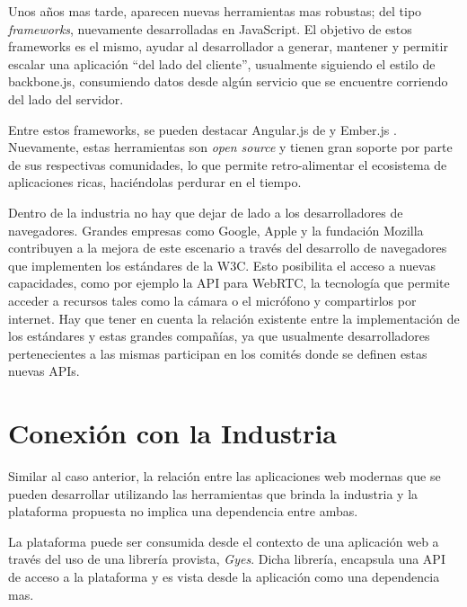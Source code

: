 Unos años mas tarde, aparecen nuevas herramientas mas robustas; del tipo \emph{frameworks}, nuevamente desarrolladas en JavaScript. El objetivo de estos frameworks es el mismo, ayudar al desarrollador a generar, mantener y permitir escalar una aplicación ``del lado del cliente'', usualmente siguiendo el estilo de backbone.js, consumiendo datos desde algún servicio que se encuentre corriendo del lado del servidor. 

Entre estos frameworks, se pueden destacar Angular.js de \citep{ind:angular} y Ember.js \citep{ind:ember}. Nuevamente, estas herramientas son \emph{open source} y tienen gran soporte por parte de sus respectivas comunidades, lo que permite retro-alimentar el ecosistema de aplicaciones ricas, haciéndolas perdurar en el tiempo.

Dentro de la industria no hay que dejar de lado a los desarrolladores de navegadores. Grandes empresas como Google, Apple y la fundación Mozilla contribuyen a la mejora de este escenario a través del desarrollo de navegadores que implementen los estándares de la W3C. Esto posibilita el acceso a nuevas capacidades, como por ejemplo la API para WebRTC, la tecnología que permite acceder a recursos tales como la cámara o el micrófono y compartirlos por internet. Hay que tener en cuenta la relación existente entre la implementación de los estándares y estas grandes compañías, ya que usualmente desarrolladores pertenecientes a las mismas participan en los comités donde se definen estas nuevas APIs. 

\section{Conexión con la Industria} \label{sec:extension_industria_conexion}

Similar al caso anterior, la relación entre las aplicaciones web modernas que se pueden desarrollar utilizando las herramientas que brinda la industria y la plataforma propuesta no implica una dependencia entre ambas. 

La plataforma puede ser consumida desde el contexto de una aplicación web a través del uso de una librería provista, \emph{Gyes}. Dicha librería, encapsula una API de acceso a la plataforma y es vista desde la aplicación como una dependencia mas. 


